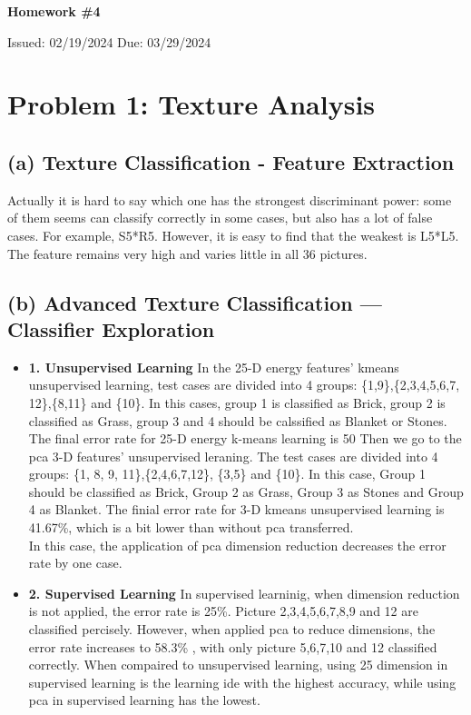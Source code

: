 \documentclass[12pt]{article}
\begin{document}
	
	\begin{center}
		\Large
		\textbf{Homework \#4}
		
		\vspace{0.2cm}
		\normalsize
		Issued: 02/19/2024 \hfill Due: 03/29/2024
	\end{center}
	
	\section*{Problem 1: Texture Analysis}
		\subsection*{(a) Texture Classification - Feature Extraction}
			Actually it is hard to say which one has the strongest discriminant power: some of them seems can classify correctly in some cases, but also has a lot of false cases. For example, S5*R5. However, it is easy to find that the weakest is L5*L5. The feature remains very high and varies little in all 36 pictures. 
		\subsection*{(b) Advanced Texture Classification --- Classifier Exploration}
		\begin{itemize}[label=$\bullet$]
			\item \textbf{1. Unsupervised Learning}  In the 25-D energy features' kmeans unsupervised learning, test cases are divided into 4 groups: \{1,9\},\{2,3,4,5,6,7, 12\},\{8,11\} and \{10\}. In this cases, group 1 is classified as Brick, group 2 is classified as Grass, group 3 and 4 should be calssified as Blanket or Stones. The final error rate for 25-D energy k-means learning is 50%
			Then we go to the pca 3-D features' unsupervised leraning. The test cases are divided into 4 groups: \{1, 8, 9, 11\},\{2,4,6,7,12\}, \{3,5\} and \{10\}. In this case, Group 1 should be classified as Brick, Group 2 as Grass, Group 3 as Stones and Group 4 as Blanket. The finial error rate for 3-D kmeans unsupervised learning is 41.67\%, which is a bit lower than without pca transferred.\\
			In this case, the application of pca dimension reduction decreases the error rate by one case.  
			
			\item \textbf{2. Supervised Learning} In supervised learninig, when dimension reduction is not applied, the error rate is 25\%. Picture 2,3,4,5,6,7,8,9 and 12 are classified percisely. However, when applied pca to reduce dimensions, the error rate increases to 58.3\% , with only picture 5,6,7,10 and 12 classified correctly. When compaired to unsupervised learning, using 25 dimension in supervised learning is the learning ide with the highest accuracy, while using pca in supervised learning has the lowest. 
		\end{itemize}
\end{document}
